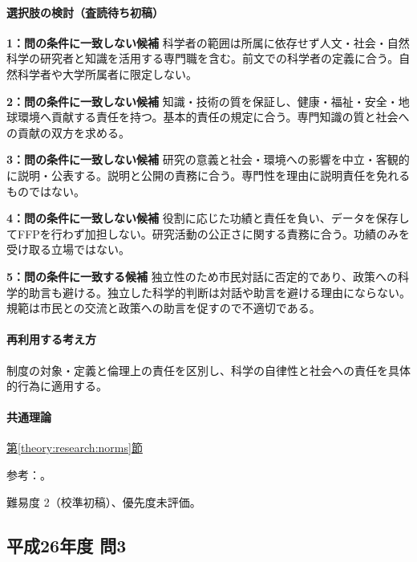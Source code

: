 \paragraph{選択肢の検討（査読待ち初稿）}\mbox{}\par

\noindent\textbf{1：問の条件に一致しない候補} 科学者の範囲は所属に依存せず人文・社会・自然科学の研究者と知識を活用する専門職を含む。前文での科学者の定義に合う。自然科学者や大学所属者に限定しない。\par

\noindent\textbf{2：問の条件に一致しない候補} 知識・技術の質を保証し、健康・福祉・安全・地球環境へ貢献する責任を持つ。基本的責任の規定に合う。専門知識の質と社会への貢献の双方を求める。\par

\noindent\textbf{3：問の条件に一致しない候補} 研究の意義と社会・環境への影響を中立・客観的に説明・公表する。説明と公開の責務に合う。専門性を理由に説明責任を免れるものではない。\par

\noindent\textbf{4：問の条件に一致しない候補} 役割に応じた功績と責任を負い、データを保存してFFPを行わず加担しない。研究活動の公正さに関する責務に合う。功績のみを受け取る立場ではない。\par

\noindent\textbf{5：問の条件に一致する候補} 独立性のため市民対話に否定的であり、政策への科学的助言も避ける。独立した科学的判断は対話や助言を避ける理由にならない。規範は市民との交流と政策への助言を促すので不適切である。\par

\paragraph{再利用する考え方} 制度の対象・定義と倫理上の責任を区別し、科学の自律性と社会への責任を具体的行為に適用する。

\paragraph{共通理論} \hyperref[theory:research:norms]{第\ref*{theory:research:norms}節}

\par 参考：\cite{scj_code2013}。

\par 難易度 2（校準初稿）、優先度未評価。

\subsection{平成26年度 問3}
\label{q:h26-reg-apt-03}

